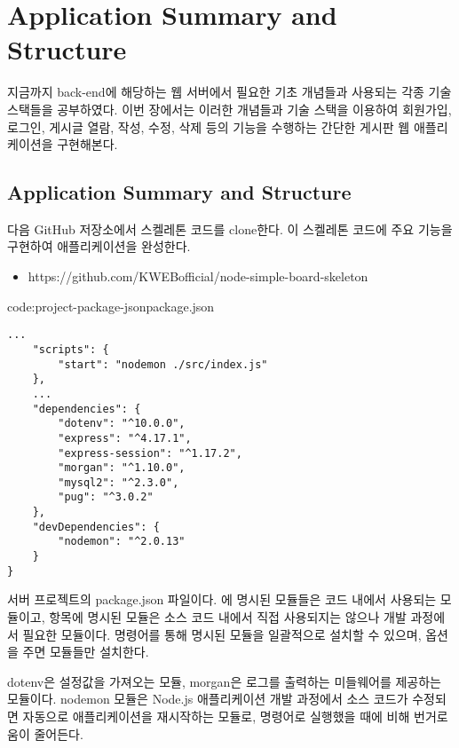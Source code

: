 \section{Application Summary and Structure}\label{sect:application-summary-and-structure}

지금까지 back-end에 해당하는 웹 서버에서 필요한 기초 개념들과 사용되는 각종 기술 스택들을 공부하였다. 이번 장에서는 이러한 개념들과 기술 스택을 이용하여 회원가입, 로그인, 게시글 열람, 작성, 수정, 삭제 등의 기능을 수행하는 간단한 게시판 웹 애플리케이션을 구현해본다.

\subsection*{Application Summary and Structure}

다음 GitHub 저장소에서 스켈레톤 코드를 clone한다. 이 스켈레톤 코드에 주요 기능을 구현하여 애플리케이션을 완성한다.

\begin{itemize}
    \item https://github.com/KWEBofficial/node-simple-board-skeleton
\end{itemize}

\begin{codeenv}{code:project-package-json}{package.json}\begin{verbatim}
...
    "scripts": {
        "start": "nodemon ./src/index.js"
    },
    ...
    "dependencies": {
        "dotenv": "^10.0.0",
        "express": "^4.17.1",
        "express-session": "^1.17.2",
        "morgan": "^1.10.0",
        "mysql2": "^2.3.0",
        "pug": "^3.0.2"
    },
    "devDependencies": {
        "nodemon": "^2.0.13"
    }
}
\end{verbatim}
\end{codeenv}

\은 서버 프로젝트의 package.json 파일이다. 에 명시된 모듈들은 코드 내에서 사용되는 모듈이고,  항목에 명시된 모듈은 소스 코드 내에서 직접 사용되지는 않으나 개발 과정에서 필요한 모듈이다.  명령어를 통해 명시된 모듈을 일괄적으로 설치할 수 있으며,  옵션을 주면  모듈들만 설치한다.

dotenv은 설정값을 가져오는 모듈, morgan은 로그를 출력하는 미들웨어를 제공하는 모듈이다. nodemon 모듈은 Node.js 애플리케이션 개발 과정에서 소스 코드가 수정되면 자동으로 애플리케이션을 재시작하는 모듈로,  명령어로 실행했을 때에 비해 번거로움이 줄어든다.
\newpage

